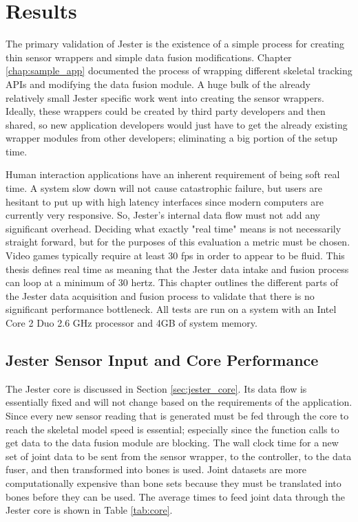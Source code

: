 \chapter{Results}

The primary validation of Jester is the existence of a simple process for creating thin sensor wrappers and simple data fusion modifications. Chapter \ref{chap:sample_app} documented the process of wrapping different skeletal tracking APIs and modifying the data fusion module. A huge bulk of the already relatively small Jester specific work went into creating the sensor wrappers. Ideally, these wrappers could be created by third party developers and then shared, so new application developers would just have to get the already existing wrapper modules from other developers; eliminating a big portion of the setup time.

Human interaction applications have an inherent requirement of being soft real time. A system slow down will not cause catastrophic failure, but users are hesitant to put up with high latency interfaces since modern computers are currently very responsive. So, Jester's internal data flow must not add any significant overhead. Deciding what exactly "real time" means is not necessarily straight forward, but for the purposes of this evaluation a metric must be chosen. Video games typically require at least 30 fps in order to appear to be fluid. This thesis defines real time as meaning that the Jester data intake and fusion process can loop at a minimum of 30 hertz. This chapter outlines the different parts of the Jester data acquisition and fusion process to validate that there is no significant performance bottleneck. All tests are run on a system with an Intel Core 2 Duo 2.6 GHz processor and 4GB of system memory.

\section{Jester Sensor Input and Core Performance}

The Jester core is discussed in Section \ref{sec:jester_core}. Its data flow is essentially fixed and will not change based on the requirements of the application. Since every new sensor reading that is generated must be fed through the core to reach the skeletal model speed is essential; especially since the function calls to get data to the data fusion module are blocking. The wall clock time for a new set of joint data to be sent from the sensor wrapper, to the controller, to the data fuser, and then transformed into bones is used. Joint datasets are more computationally expensive than bone sets because they must be translated into bones before they can be used. The average times to feed joint data through the Jester core is shown in Table \ref{tab:core}.

